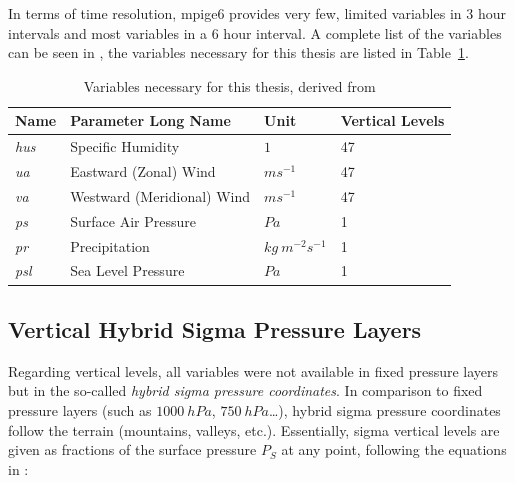 In terms of time resolution, \ac{mpige6} provides very few, limited variables in 3 hour intervals and most variables in a 6 hour interval.  
A complete list of the variables can be seen in \cite[Table 3]{olonscheck_new_2023}, the variables necessary for this thesis are listed in Table~\ref{tab:thesisVariables}. 

\begin{table}[bht]
\centering
\caption{Variables necessary for this thesis, derived from \cite{olonscheck_new_2023}}
\begin{tabular}{l|l|l|l}
  \label{tab:thesisVariables}
\textbf{Name} & \textbf{Parameter Long Name} & \textbf{Unit}                & \multicolumn{1}{l}{\textbf{Vertical Levels}}  \\ 
\hline
\textit{hus}              & Specific Humidity            & $1$                        & 47                                            \\
\textit{ua}               & Eastward (Zonal) Wind        & $ms^{-1}$              & 47                                            \\
\textit{va}               & Westward (Meridional) Wind   & $ms^{-1}$              & 47                                            \\
\textit{ps}               & Surface Air Pressure         & $Pa$                           & 1                                             \\
\textit{pr}               & Precipitation                & $kg~m^{-2} s^{-1}$ & 1    \\                                        
\textit{psl}               & Sea Level Pressure                & $Pa$ & 1            \\                                
\end{tabular}
\end{table}


\subsection{Vertical Hybrid Sigma Pressure Layers}
\label{sec:hybridsigma}

Regarding vertical levels, all variables were not available in fixed pressure layers but in the so-called \textit{ hybrid sigma pressure coordinates}. 
In comparison to fixed pressure layers (such as $1000 ~hPa$, $750 ~hPa$\dots), hybrid sigma pressure coordinates follow the terrain (mountains, valleys, etc.). 
Essentially, sigma vertical levels are given as fractions of the surface pressure $P_S$ at any point, following the equations in \cite{eckermann_hybrid_2009}: 

